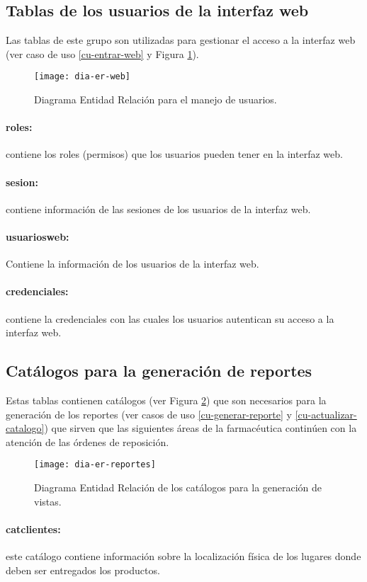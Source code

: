 \subsection{Tablas de los usuarios de la interfaz web}
Las tablas de este grupo son utilizadas para gestionar el acceso a la interfaz web (ver caso de uso \ref{cu-entrar-web} y Figura \ref{fig:dia-er-web}).
\begin{figure}[h]
  \centering
  \texttt{[image: dia-er-web]} 
  \caption{Diagrama Entidad Relación para el manejo de usuarios.}
  \label{fig:dia-er-web}
\end{figure}
\paragraph{roles:} contiene los roles (permisos) que los usuarios pueden tener en la interfaz web.
\paragraph{sesion:} contiene información de las sesiones de los usuarios de la interfaz web.
\paragraph{usuarios{\textunderscore}web:} Contiene la información de los usuarios de la interfaz web.
\paragraph{credenciales:} contiene la credenciales con las cuales los usuarios autentican su acceso a la interfaz web.


\subsection{Catálogos para la generación de reportes}
Estas tablas contienen catálogos (ver Figura \ref{fig:dia-er-reportes}) que son necesarios para la generación de los reportes (ver casos de uso \ref{cu-generar-reporte} y \ref{cu-actualizar-catalogo}) que sirven que las siguientes áreas de la farmacéutica continúen con la atención de las órdenes de reposición.
\begin{figure}[h]
  \centering
  \texttt{[image: dia-er-reportes]} 
  \caption{Diagrama Entidad Relación de los catálogos para la generación de vistas.}
  \label{fig:dia-er-reportes}
\end{figure}
\paragraph{cat{\textunderscore}clientes:} este catálogo contiene información sobre la localización física de los lugares donde deben ser entregados los productos.
